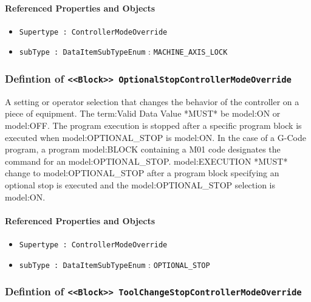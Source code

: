 \FloatBarrier
\paragraph{Referenced Properties and Objects}

\begin{itemize}
\item \texttt{Supertype : ControllerModeOverride}

\item \texttt{subType : DataItemSubTypeEnum} : \texttt{MACHINE_AXIS_LOCK}

\end{itemize}
\FloatBarrier
\subsubsection{Defintion of \texttt{<<Block>> OptionalStopControllerModeOverride}}
  \label{type:OptionalStopControllerModeOverride}

\FloatBarrier

A setting or operator selection that changes the behavior of the controller on a piece of equipment. 
 The {term:Valid Data Value} *MUST* be {model:ON} or {model:OFF}.
 The program execution is stopped after a specific program block is executed when {model:OPTIONAL_STOP} is {model:ON}.    
 In the case of a G-Code program, a program {model:BLOCK} containing a M01 code designates the command for an {model:OPTIONAL_STOP}. 
 {model:EXECUTION} *MUST* change to {model:OPTIONAL_STOP} after a program block specifying an optional stop is executed and the {model:OPTIONAL_STOP} selection is {model:ON}.

\FloatBarrier
\paragraph{Referenced Properties and Objects}

\begin{itemize}
\item \texttt{Supertype : ControllerModeOverride}

\item \texttt{subType : DataItemSubTypeEnum} : \texttt{OPTIONAL_STOP}

\end{itemize}
\FloatBarrier
\subsubsection{Defintion of \texttt{<<Block>> ToolChangeStopControllerModeOverride}}
  \label{type:ToolChangeStopControllerModeOverride}

